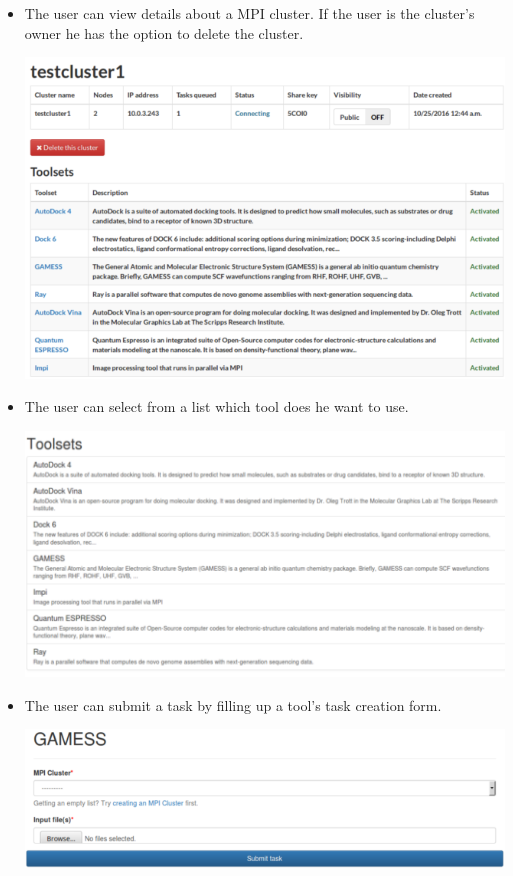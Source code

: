 \begin{itemize}
		\item The user can view details about a MPI cluster. If the user is the cluster's owner he has the option to delete the cluster. \newline
		\begin{center}			
			\includegraphics[scale=0.40]{./images/mpi_detail_view_2.png}			
		\end{center}	
		
		\item The user can select from a list which tool does he want to use. 	
		\begin{center}			
			\includegraphics[scale=0.45]{./images/toolset_list_2.png}			
		\end{center}
		
		\item The user can submit a task by filling up a tool's task creation form. \newline
		\begin{center}			
			\includegraphics[scale=0.40]{./images/gamess_form_2.png}			
		\end{center}	
		

\end{itemize}
